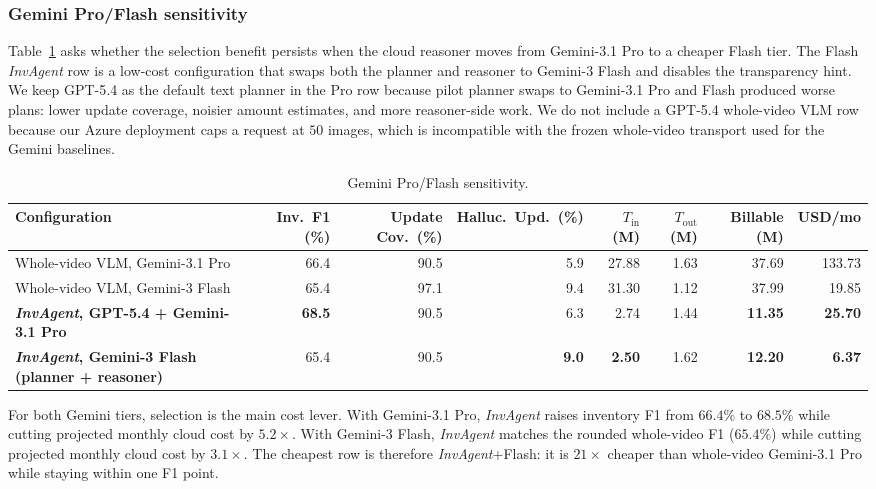 \documentclass[sigconf,anonymous,nonacm]{acmart}
\newcommand{\sys}{\textit{InvAgent}\xspace}
\begin{document}
\subsubsection{Gemini Pro/Flash sensitivity}

Table~\ref{tab:vlm-switch} asks whether the selection benefit persists
when the cloud reasoner moves from Gemini-3.1 Pro to a cheaper Flash
tier. The Flash \sys row is a low-cost configuration that swaps both
the planner and reasoner to Gemini-3 Flash and disables the transparency
hint. We keep GPT-5.4 as the default text planner in the Pro row because
pilot planner swaps to Gemini-3.1 Pro and Flash produced worse plans:
lower update coverage, noisier amount estimates, and more reasoner-side
work. We do not include a GPT-5.4 whole-video VLM row because our Azure
deployment caps a request at $50$ images, which is incompatible with the
frozen whole-video transport used for the Gemini baselines.

\begin{table}[t]
\centering
\small
\setlength{\tabcolsep}{4pt}
\caption{Gemini Pro/Flash sensitivity.}
\label{tab:vlm-switch}
\begin{tabular}{lrrrrrrr}
\toprule
Configuration & Inv.~F1 (\%) & Update Cov.~(\%) & Halluc.~Upd.~(\%) & $T_{\mathrm{in}}$ (M) & $T_{\mathrm{out}}$ (M) & Billable (M) & USD/mo \\
\midrule
Whole-video VLM, Gemini-3.1 Pro        & 66.4 & 90.5 & 5.9 & 27.88 & 1.63 & 37.69 & 133.73 \\
Whole-video VLM, Gemini-3 Flash        & 65.4 & 97.1 & 9.4 & 31.30 & 1.12 & 37.99 &  19.85 \\
\midrule
\textbf{\sys, GPT-5.4 + Gemini-3.1 Pro} & \textbf{68.5} & 90.5 & 6.3 &  2.74 & 1.44 & \textbf{11.35} &  \textbf{25.70} \\
\textbf{\sys, Gemini-3 Flash (planner + reasoner)} & 65.4 & 90.5 & \textbf{9.0} &  \textbf{2.50} & 1.62 & \textbf{12.20} &   \textbf{6.37} \\
\bottomrule
\end{tabular}
\end{table}

For both Gemini tiers, selection is the main cost lever. With
Gemini-3.1 Pro, \sys raises inventory F1 from $66.4\%$ to $68.5\%$
while cutting projected monthly cloud cost by $5.2\times$. With
Gemini-3 Flash, \sys matches the rounded whole-video F1 ($65.4\%$)
while cutting projected monthly cloud cost by $3.1\times$. The cheapest
row is therefore \sys+Flash: it is $21\times$ cheaper than whole-video
Gemini-3.1 Pro while staying within one F1 point.
\end{document}
